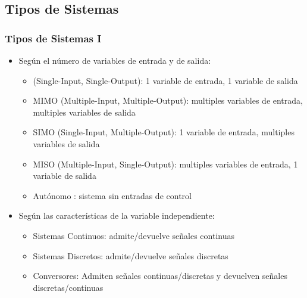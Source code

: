 \subsection{Tipos de Sistemas}

\begin{frame}\frametitle{Tipos de Sistemas I}
\vspace{-0,3cm}
\begin{figure}
  \centering
  \small
  \end{figure}

\vspace{-0,5cm}
  \begin{itemize}
    \item Según el número de variables de entrada y de salida:
    \begin{itemize}
      \item \color{olivegreen}{SISO }\color{black}  (Single-Input, Single-Output): 1 variable de entrada, 1 variable de salida
      \item \alert{MIMO} (Multiple-Input, Multiple-Output): multiples variables de entrada, multiples variables de salida
      \item \alert{SIMO} (Single-Input, Multiple-Output): 1 variable de entrada, multiples variables de salida
      \item \alert{MISO} (Multiple-Input, Single-Output): multiples variables de entrada, 1 variable de salida
      \item \alert{Aut\'{o}nomo} :  sistema sin entradas de control
    \end{itemize}
    \item Según las características de la variable independiente:
    \begin{itemize}
      \item \alert{Sistemas Continuos}: admite/devuelve señales continuas
      \item \alert{Sistemas Discretos}: admite/devuelve señales discretas
      \item \alert{Conversores}: Admiten señales continuas/discretas y devuelven señales discretas/continuas
    \end{itemize}
  \end{itemize}
  \vspace{-0.4cm}
\end{frame}

